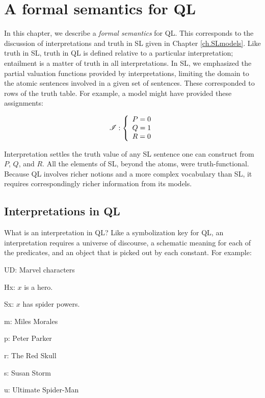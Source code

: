 \chapter{A formal semantics for QL}
\label{ch.QL.models}

In this chapter, we describe a \emph{formal semantics} for QL. This corresponds to the discussion of interpretations and truth in SL given in Chapter \ref{ch.SLmodels}. Like truth in SL, truth in QL is defined relative to a particular interpretation; entailment is a matter of truth in all interpretations. In SL, we emphasized the partial valuation functions provided by interpretations, limiting the domain to the atomic sentences involved in a given set of sentences. These corresponded to rows of the truth table. For example, a model  might have provided these assignments:

\begin{displaymath}
\mathscr{I} :
\left\{
	\begin{array}{ll}
	P = 0\\
	Q = 1\\
	R = 0
	\end{array}
\right.
\end{displaymath}

Interpretation  settles the truth value of any SL sentence one can construct from $P$, $Q$, and $R$. All the elements of SL, beyond the atoms, were truth-functional. Because QL involves richer notions and a more complex vocabulary than SL, it requires correspondingly richer information from its models.

\section{Interpretations in QL}

What is an interpretation in QL? Like a symbolization key for QL, an interpretation requires a universe of discourse, a schematic meaning for each of the predicates, and an object that is picked out by each constant. For example:

\begin{ekey}
\item[UD:] Marvel characters
\item[Hx:] $x$ is a hero.
\item[Sx:] $x$ has spider powers.
\item[m:] Miles Morales
\item[p:] Peter Parker
\item[r:] The Red Skull
\item[s:] Susan Storm
\item[u:] Ultimate Spider-Man
\end{ekey}

